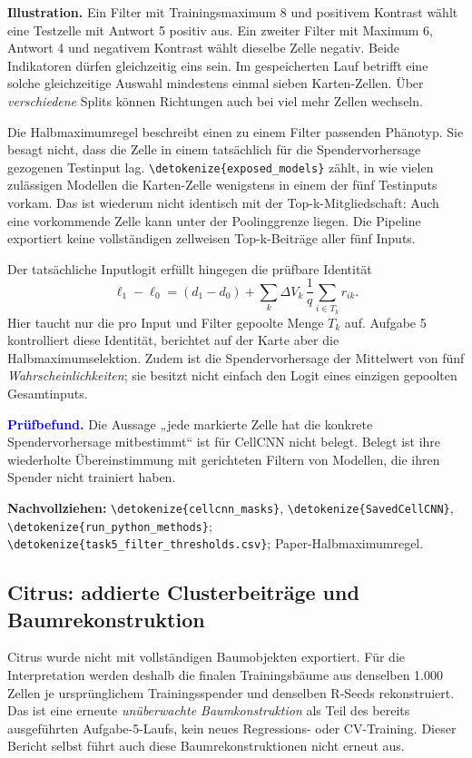 \documentclass[11pt,a4paper]{article}
\newcommand{\code}[1]{\expandafter\nolinkurl\expandafter{\detokenize{#1}}}
\newcommand{\source}[1]{\par{\footnotesize\raggedright\color{muted}\textbf{Nachvollziehen:} #1\par}}
\newcommand{\finding}[1]{\par\smallskip\noindent\textcolor{blue}{\textbf{Prüfbefund.}} #1\par}
\begin{document}
\textbf{Illustration.} Ein Filter mit Trainingsmaximum 8 und positivem
Kontrast wählt eine Testzelle mit Antwort 5 positiv aus. Ein zweiter Filter
mit Maximum 6, Antwort 4 und negativem Kontrast wählt dieselbe Zelle
negativ. Beide Indikatoren dürfen gleichzeitig eins sein. Im gespeicherten
Lauf betrifft eine solche gleichzeitige Auswahl mindestens einmal sieben
Karten-Zellen. Über \emph{verschiedene} Splits können Richtungen auch bei
viel mehr Zellen wechseln.

Die Halbmaximumregel beschreibt einen zu einem Filter passenden Phänotyp.
Sie besagt nicht, dass die Zelle in einem tatsächlich für die
Spendervorhersage gezogenen Testinput lag. \code{exposed_models} zählt,
in wie vielen zulässigen Modellen die Karten-Zelle wenigstens in einem
der fünf Testinputs vorkam. Das ist wiederum nicht identisch mit der
Top-k-Mitgliedschaft: Auch eine vorkommende Zelle kann unter der
Poolinggrenze liegen. Die Pipeline exportiert keine vollständigen
zellweisen Top-k-Beiträge aller fünf Inputs.

Der tatsächliche Inputlogit erfüllt hingegen die prüfbare Identität
\[
 \ell_1-\ell_0=(d_1-d_0)+\sum_k\Delta V_k\,
       \frac1q\sum_{i\in T_k}r_{ik}.
\]
Hier taucht nur die pro Input und Filter gepoolte Menge \(T_k\) auf.
Aufgabe 5 kontrolliert diese Identität, berichtet auf der Karte aber die
Halbmaximumselektion. Zudem ist die Spendervorhersage der Mittelwert von
fünf \emph{Wahrscheinlichkeiten}; sie besitzt nicht einfach den Logit
eines einzigen gepoolten Gesamtinputs.

\finding{Die Aussage „jede markierte Zelle hat die konkrete
Spendervorhersage mitbestimmt“ ist für CellCNN nicht belegt. Belegt ist
ihre wiederholte Übereinstimmung mit gerichteten Filtern von Modellen,
die ihren Spender nicht trainiert haben.}
\source{\code{cellcnn_masks}, \code{SavedCellCNN}, \code{run_python_methods};
\code{task5_filter_thresholds.csv}; Paper-Halbmaximumregel\cite{cellcnn}.}

\clearpage
\subsection*{Citrus: addierte Clusterbeiträge und Baumrekonstruktion}
Citrus wurde nicht mit vollständigen Baumobjekten exportiert. Für die
Interpretation werden deshalb die finalen Trainingsbäume aus denselben
1.000 Zellen je ursprünglichem Trainingsspender und denselben R-Seeds
rekonstruiert. Das ist eine erneute \emph{unüberwachte Baumkonstruktion}
als Teil des bereits ausgeführten Aufgabe-5-Laufs, kein neues
Regressions- oder CV-Training. Dieser Bericht selbst führt auch diese
Baumrekonstruktionen nicht erneut aus.
\end{document}
